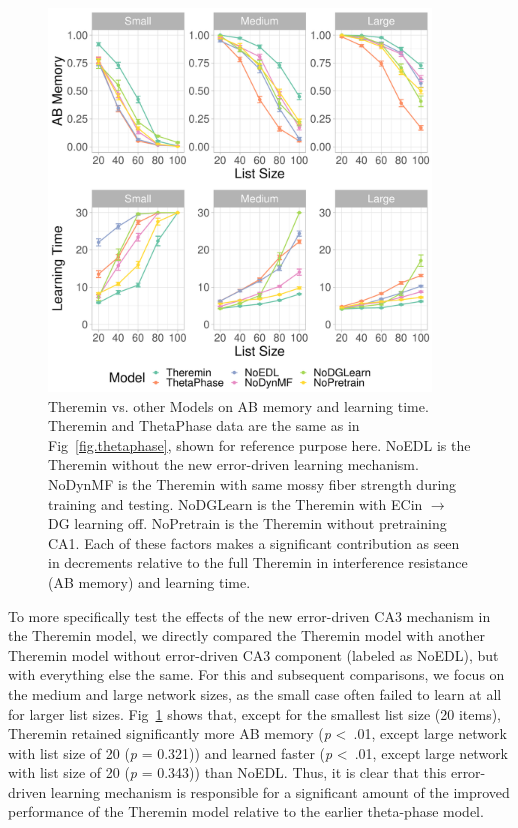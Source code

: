 \documentclass[11pt,twoside]{article}
\newif\myifpdf
\begin{document}
\begin{figure}
  \centering\includegraphics[width=4in]{fig_hip_edl_mods}
  \caption{\footnotesize Theremin vs. other Models on AB memory and learning time.  Theremin and ThetaPhase data are the same as in Fig~\ref{fig.thetaphase}, shown for reference purpose here.  NoEDL is the Theremin without the new error-driven learning mechanism. NoDynMF is the Theremin with same mossy fiber strength during training and testing. NoDGLearn is the Theremin with ECin $\rightarrow$ DG learning off. NoPretrain is the Theremin without pretraining CA1. Each of these factors makes a significant contribution as seen in decrements relative to the full Theremin in interference resistance (AB memory) and learning time.}
\label{fig.mods}
\end{figure}

To more specifically test the effects of the new error-driven CA3 mechanism in the Theremin model, we directly compared the Theremin model with another Theremin model without error-driven CA3 component (labeled as NoEDL), but with everything else the same. For this and subsequent comparisons, we focus on the medium and large network sizes, as the small case often failed to learn at all for larger list sizes.  Fig~\ref{fig.mods} shows that, except for the smallest list size (20 items), Theremin retained significantly more AB memory (\emph{p} \textless \ .01, except large network with list size of 20 (\emph{p} = 0.321)) and learned faster (\emph{p} \textless \ .01, except large network with list size of 20 (\emph{p} = 0.343)) than NoEDL.  Thus, it is clear that this error-driven learning mechanism is responsible for a significant amount of the improved performance of the Theremin model relative to the earlier theta-phase model.
\end{document}
